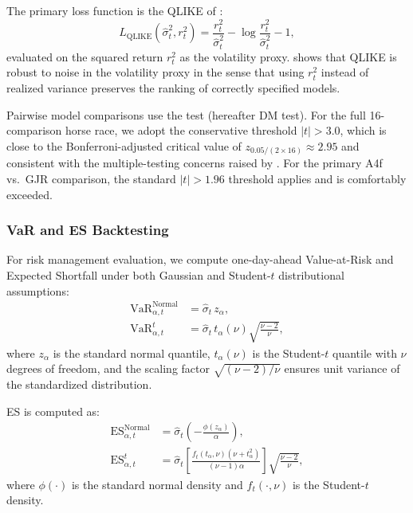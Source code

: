 \documentclass[12pt,a4paper]{article}
\begin{document}
The primary loss function is the QLIKE of \citet{patton2011}:
\begin{equation}
L_{\text{QLIKE}}(\hat{\sigma}_t^2, r_t^2) = \frac{r_t^2}{\hat{\sigma}_t^2} - \log\frac{r_t^2}{\hat{\sigma}_t^2} - 1,
\label{eq:qlike}
\end{equation}
evaluated on the squared return $r_t^2$ as the volatility proxy. \citet{patton2011} shows that QLIKE is robust to noise in the volatility proxy in the sense that using $r_t^2$ instead of realized variance preserves the ranking of correctly specified models.

Pairwise model comparisons use the \citet{diebold2002} test (hereafter DM test). For the full 16-comparison horse race, we adopt the conservative threshold $|t| > 3.0$, which is close to the Bonferroni-adjusted critical value of $z_{0.05/(2 \times 16)} \approx 2.95$ and consistent with the multiple-testing concerns raised by \citet{harvey2016}. For the primary A4f vs.\ GJR comparison, the standard $|t| > 1.96$ threshold applies and is comfortably exceeded.

\subsubsection{VaR and ES Backtesting}

For risk management evaluation, we compute one-day-ahead Value-at-Risk and Expected Shortfall under both Gaussian and Student-$t$ distributional assumptions:
\begin{align}
\mathrm{VaR}_{\alpha,t}^{\text{Normal}} &= \hat{\sigma}_t \, z_\alpha, \label{eq:var_normal} \\
\mathrm{VaR}_{\alpha,t}^{t} &= \hat{\sigma}_t \, t_\alpha(\nu) \sqrt{\frac{\nu-2}{\nu}}, \label{eq:var_t}
\end{align}
where $z_\alpha$ is the standard normal quantile, $t_\alpha(\nu)$ is the Student-$t$ quantile with $\nu$ degrees of freedom, and the scaling factor $\sqrt{(\nu-2)/\nu}$ ensures unit variance of the standardized distribution.

ES is computed as:
\begin{align}
\mathrm{ES}_{\alpha,t}^{\text{Normal}} &= \hat{\sigma}_t \left(-\frac{\phi(z_\alpha)}{\alpha}\right), \label{eq:es_normal} \\
\mathrm{ES}_{\alpha,t}^{t} &= \hat{\sigma}_t \left[\frac{f_t(t_\alpha, \nu)(\nu + t_\alpha^2)}{(\nu-1)\alpha}\right] \sqrt{\frac{\nu-2}{\nu}}, \label{eq:es_t}
\end{align}
where $\phi(\cdot)$ is the standard normal density and $f_t(\cdot, \nu)$ is the Student-$t$ density.
\end{document}
